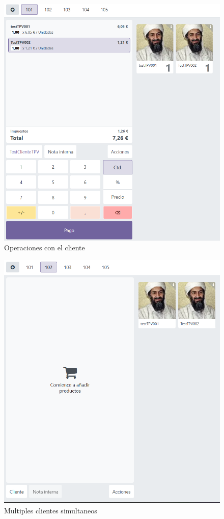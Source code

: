 \documentclass[a4paper,12pt]{article}
\begin{document}
\begin{figure}[h!]
    \centering
    \includegraphics[width=1\textwidth]{pr2odoo56-operacionesCliente101.png}
    \caption{Operaciones con el cliente}
\end{figure}
\FloatBarrier

\begin{figure}[h!]
    \centering
    \includegraphics[width=1\textwidth]{pr2odoo57-diferentesClientesSimultaneos.png}
    \caption{Multiples clientes simultaneos}
\end{figure}
\FloatBarrier
\end{document}
